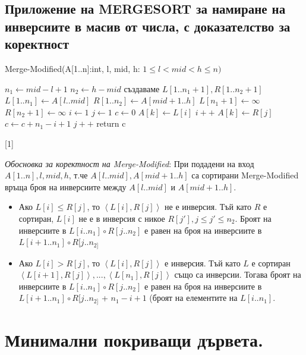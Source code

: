 \documentclass{article}
\renewcommand{\\}{\newline}
\begin{document}
\subsection{Приложение на MERGESORT за намиране на инверсиите в масив от числа, с доказателство за коректност}

Merge-Modified(A[1..n]:int, l, mid, h: \(1 \leq l < mid < h \leq n)\)  
\begin{algorithmic}[1]
  \State \(n_{1} \gets mid - l +1\)  
  \State \(n_{2} \gets h - mid\)
  \State създаваме \(L[1..n_{1} +1], R[1..n_{2} +1]\)  
  \State \(L[1..n_{1}] \gets A[l..mid]\)  
  \State \(R[1..n_{2}] \gets A[mid+1..h]\)  
  \State \(L[n_{1} + 1] \gets \infty\)  
  \State \(R[n_{2} + 1] \gets \infty\)  
  \State \(i \gets 1\)  
  \State \(j \gets 1\)  
  \State \(c \gets 0\)  
       \State \(A[k] \gets L[i]\)
       \State \(i++\)
    \Else
       \State \(A[k] \gets R[j]\)  
       \State \(c \gets c + n_{1} - i + 1\)  
       \State \(j++\)
    \EndIf
  \EndFor
  \State return c
\end{algorithmic}[1]

\textit{Обосновка за коректност на Merge-Modified}: При подадени на вход \(A[1..n], l, mid, h\), т.че \(A[l..mid], A[mid+1..h]\)  са сортирани Merge-Modified връща броя на инверсиите между \(A[l..mid]\) и \(A[mid+1..h]\).

\begin{itemize}
  \item Ако \(L[i] \leq R[j]\), то \(\left\langle L[i], R[j]\right\rangle\) не е инверсия. Тъй като \(R\)  е сортиран, \(L[i]\) не е в инверсия с никое \(R[j'], j \leq j' \leq n_{2}\). Броят на инверсиите в \(L[i..n_{1}]\circ R[j..n_{2}]\) е равен на броя на инверсиите в \(L[i+1..n_{1}]\circ R[j..n_{2]}\)
  \item Ако \(L[i] > R[j]\), то \(\left\langle L[i], R[j]\right\rangle\) е инверсия. Тъй като \(L\) е сортиран \(\left\langle L[i+1], R[j]\right\rangle, ..., \left\langle L[n_{1}], R[j]\right\rangle\) също са инверсии. Тогава броят на инверсиите в \(L[i..n_{1}]\circ R[j..n_{2}]\) е равен на броя на инверсиите в \(L[i+1..n_{1}]\circ R[j..n_{2]}\) + \(n_{1} - i + 1\) (броят на елементите на \(L[i..n_{1}]\).   
 
\end{itemize}
\newpage
\section{Минимални покриващи дървета.}
\end{document}
